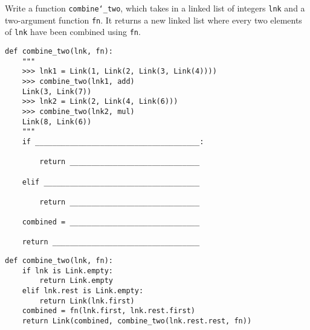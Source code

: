 \begin{blocksection}
\question Write a function \texttt{combine\char`_two}, which takes in a linked list of integers \texttt{lnk} and a two-argument function \texttt{fn}. It returns a new linked list where every two elements of \texttt{lnk} have been combined using \texttt{fn}.\\

\begin{lstlisting}
def combine_two(lnk, fn):
    """
    >>> lnk1 = Link(1, Link(2, Link(3, Link(4))))
    >>> combine_two(lnk1, add)
    Link(3, Link(7))
    >>> lnk2 = Link(2, Link(4, Link(6)))
    >>> combine_two(lnk2, mul)
    Link(8, Link(6))
    """
    if ______________________________________:

        return ______________________________

    elif ____________________________________

        return ______________________________

    combined = ______________________________

    return __________________________________
\end{lstlisting}

\begin{solution}[1in]
\begin{lstlisting}
def combine_two(lnk, fn):
    if lnk is Link.empty:
        return Link.empty
    elif lnk.rest is Link.empty:
        return Link(lnk.first)
    combined = fn(lnk.first, lnk.rest.first)
    return Link(combined, combine_two(lnk.rest.rest, fn))
\end{lstlisting}
\end{solution}

\end{blocksection}
